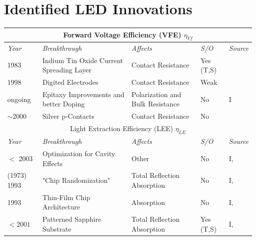 \documentclass[10pt]{article}
\begin{document}
\section{Identified LED Innovations}

\begin{table}[H]
    \begin{tabularx}{\textwidth}{ |l|X|X|l|l| }
        \multicolumn{5}{c}{Forward Voltage Efficiency (VFE) $\eta_{Vf}$} \\
        \hline
            \textit{Year} & \textit{Breakthrough} & \textit{Affects} & \textit{S/O} & \textit{Source} \\
        \hline
            1983 & Indium Tin Oxide \newline Current Spreading Layer & Contact Resistance & Yes (T,S) & \cite{margalith1999indium}\\
        \hline
            1998 & Digited Electrodes & Contact Resistance & Weak & \cite{steigerwald2001electrode} \\
        \hline
            ongoing & Epitaxy Improvements \newline and better Doping & Polarization and \newline Bulk Resistance & No & I \\
        \hline
        $\sim$2000 & Silver p-Contacts & Contact Resistance & No & \cite{kondoh2001nitride} \\
        \hline
        \multicolumn{5}{c}{Light Extraction Efficiency (LEE) $\eta_{LE}$} \\
        \hline
            \textit{Year} & \textit{Breakthrough} & \textit{Affects} & \textit{S/O} & \textit{Source} \\
        \hline
            $<$ 2003 & Optimization for  \newline Cavity Effects & Other & No & I, \cite{Shen2003} \\
        \hline
            (1973) 1993 & "Chip \newline Randomization" & Total Reflection \newline Absorption & No & I, \cite{bergh1973surface}\cite{Schnitzer1993} \\
        \hline
            1993 & Thin-Film \newline Chip Architecture & Absorption & No & I, \cite{Schnitzer1993} \\
        \hline
            $<2001$ & Patterned Sapphire \newline Substrate  & Total Reflection \newline Absorption & Yes (T,S) & I, \cite{Tadatomo2001} \\

\end{tabularx}
\end{table}
\end{document}
